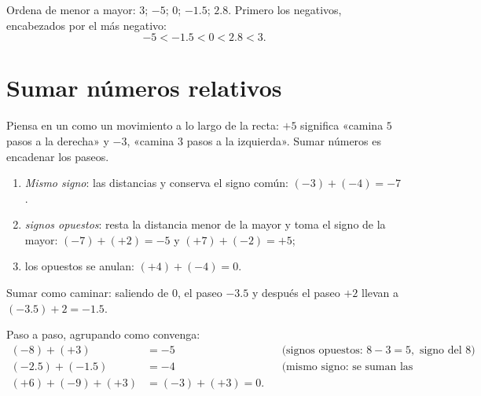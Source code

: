 \begin{example}\label{ex:g7:negatives:compare}
Ordena de menor a mayor: $3$; $-5$; $0$; $-1.5$; $2.8$.
Primero los negativos, encabezados por el más negativo:
\[
-5 < -1.5 < 0 < 2.8 < 3 .
\]
\end{example}

\section{Sumar números relativos}

Piensa en un  como un movimiento a lo largo de la recta: $+5$ significa
«camina $5$ pasos a la derecha» y $-3$, «camina $3$ pasos a la izquierda». Sumar
números es encadenar los paseos.

\begin{method}\label{met:g7:negatives:add}
\begin{enumerate}
  \item \emph{Mismo signo}:  las distancias y conserva el signo común:
        $(-3) + (-4) = -7$.
  \item \emph{signos opuestos}: resta la distancia menor de la
        mayor y toma el signo de la mayor:
        $(-7) + (+2) = -5$ y $(+7) + (-2) = +5$;
  \item los opuestos se anulan: $(+4) + (-4) = 0$.
\end{enumerate}
\end{method}

\begin{omfigure}

{\small Sumar como caminar: saliendo de $0$, el paseo $-3.5$ y después el
paseo $+2$ llevan a $(-3.5) + 2 = -1.5$.}
\end{omfigure}

\begin{example}\label{ex:g7:negatives:add}
Paso a paso, agrupando como convenga:
\begin{align*}
(-8) + (+3) &= -5 && \text{(signos opuestos: } 8 - 3 = 5,
\text{ signo del } 8)\\
(-2.5) + (-1.5) &= -4 && \text{(mismo signo: se suman las distancias)}\\
(+6) + (-9) + (+3) &= (-3) + (+3) = 0 .
\end{align*}
\end{example}

